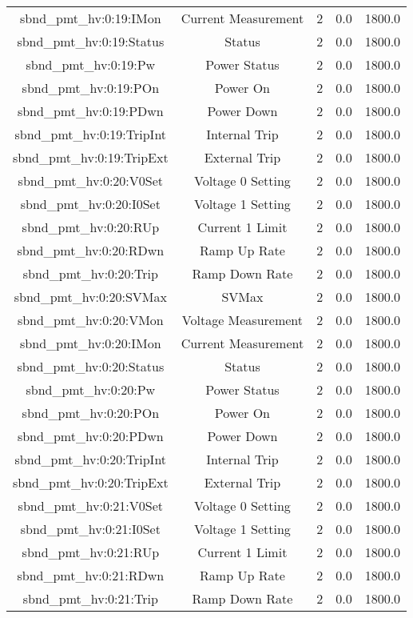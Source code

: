 \begin{table}[ptb]
\begin{tabular}{c | c c c c}
sbnd_pmt_hv:0:19:IMon & Current Measurement & 2 & 0.0 & 1800.0\\ 
sbnd_pmt_hv:0:19:Status & Status & 2 & 0.0 & 1800.0\\ 
sbnd_pmt_hv:0:19:Pw & Power Status & 2 & 0.0 & 1800.0\\ 
sbnd_pmt_hv:0:19:POn & Power On & 2 & 0.0 & 1800.0\\ 
sbnd_pmt_hv:0:19:PDwn & Power Down & 2 & 0.0 & 1800.0\\ 
sbnd_pmt_hv:0:19:TripInt & Internal Trip & 2 & 0.0 & 1800.0\\ 
sbnd_pmt_hv:0:19:TripExt & External Trip & 2 & 0.0 & 1800.0\\ 
sbnd_pmt_hv:0:20:V0Set & Voltage 0 Setting & 2 & 0.0 & 1800.0\\ 
sbnd_pmt_hv:0:20:I0Set & Voltage 1 Setting & 2 & 0.0 & 1800.0\\ 
sbnd_pmt_hv:0:20:RUp & Current 1 Limit & 2 & 0.0 & 1800.0\\ 
sbnd_pmt_hv:0:20:RDwn & Ramp Up Rate & 2 & 0.0 & 1800.0\\ 
sbnd_pmt_hv:0:20:Trip & Ramp Down Rate & 2 & 0.0 & 1800.0\\ 
sbnd_pmt_hv:0:20:SVMax & SVMax & 2 & 0.0 & 1800.0\\ 
sbnd_pmt_hv:0:20:VMon & Voltage Measurement & 2 & 0.0 & 1800.0\\ 
sbnd_pmt_hv:0:20:IMon & Current Measurement & 2 & 0.0 & 1800.0\\ 
sbnd_pmt_hv:0:20:Status & Status & 2 & 0.0 & 1800.0\\ 
sbnd_pmt_hv:0:20:Pw & Power Status & 2 & 0.0 & 1800.0\\ 
sbnd_pmt_hv:0:20:POn & Power On & 2 & 0.0 & 1800.0\\ 
sbnd_pmt_hv:0:20:PDwn & Power Down & 2 & 0.0 & 1800.0\\ 
sbnd_pmt_hv:0:20:TripInt & Internal Trip & 2 & 0.0 & 1800.0\\ 
sbnd_pmt_hv:0:20:TripExt & External Trip & 2 & 0.0 & 1800.0\\ 
sbnd_pmt_hv:0:21:V0Set & Voltage 0 Setting & 2 & 0.0 & 1800.0\\ 
sbnd_pmt_hv:0:21:I0Set & Voltage 1 Setting & 2 & 0.0 & 1800.0\\ 
sbnd_pmt_hv:0:21:RUp & Current 1 Limit & 2 & 0.0 & 1800.0\\ 
sbnd_pmt_hv:0:21:RDwn & Ramp Up Rate & 2 & 0.0 & 1800.0\\ 
sbnd_pmt_hv:0:21:Trip & Ramp Down Rate & 2 & 0.0 & 1800.0\\ 

\end{tabular}
\end{table}
